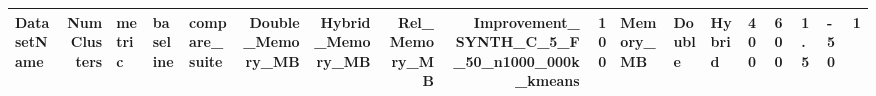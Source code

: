 \begin{tabular}{lrlllrrrrr}
\toprule
DatasetName & NumClusters & metric & baseline & compare_suite & Double_Memory_MB & Hybrid_Memory_MB & Rel_Memory_MB & Improvement_%
\midrule
SYNTH_C_5_F_50_n1000_000k_kmeans & 100 & Memory_MB & Double & Hybrid & 400 & 600 & 1.5 & -50 & 1 \\
\bottomrule
\end{tabular}
